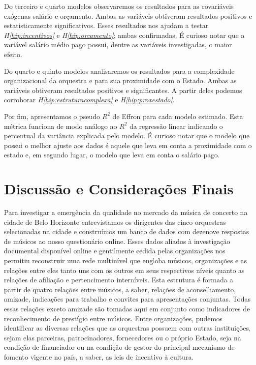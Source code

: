 \documentclass[a4paper, 12pt, openright, oneside, german, french, english, brazil]{abntex2}
\begin{document}
	Do terceiro e quarto modelos observaremos os resultados para as covariáveis exógenas salário e orçamento. Ambas as variáveis obtiveram resultados positivos e estatisticamente significativos. Esses resultados nos ajudam a testar \textit{H\ref{hip:incentivos}} e \textit{H\ref{hip:orcamento}}; ambas confirmadas. É curioso notar que a variável salário médio pago possui, dentre as variáveis investigadas, o maior efeito. 
			
	Do quarto e quinto modelos analisaremos os resultados para a complexidade organizacional da orquestra e para sua proximidade com o Estado. Ambas as variáveis obtiveram resultados positivos e significantes. A partir deles podemos corroborar \textit{H\ref{hip:estruturacomplexa}} e \textit{H\ref{hip:proxestado}}.

        Por fim, apresentamos o pseudo $R^2$ de Effron para cada modelo estimado. Esta métrica funciona de modo análogo ao $R^2$ da regressão linear indicando o percentual da variância explicada pelo modelo. É curioso notar que o modelo que possui o melhor ajuste aos dados é aquele que leva em conta a proximidade com o estado e, em segundo lugar, o modelo que leva em conta o salário pago.


	
	\chapter{Discussão e Considerações Finais}

	Para investigar a emergência da qualidade no mercado da música de concerto na cidade de Belo Horizonte entrevistamos os dirigentes das cinco orquestras selecionadas na cidade e construímos um banco de dados com dezenove respostas de músicos ao nosso questionário online. Esses dados aliados à investigação documental disponível online e gentilmente cedida pelas organizações nos permitiu reconstruir uma rede multinível que engloba músicos, organizações e as relações entre eles tanto uns com os outros em seus respectivos níveis quanto as relações de afiliação e pertencimento interníveis. Esta estrutura é formada a partir de quatro relações entre músicos, a saber, relações de aconselhamento, amizade, indicações para trabalho e convites para apresentações conjuntas. Todas essas relações exceto amizade são tomadas aqui em conjunto como indicadores de reconhecimento de prestígio entre músicos. Entre organizações, pudemos identificar as diversas relações que as orquestras possuem com outras instituições, sejam elas parceiras, patrocinadores, fornecedores ou o próprio Estado, seja na condição de financiador ou na condição de gestor do principal mecanismo de fomento vigente no país, a saber, as leis de incentivo à cultura.
\end{document}

